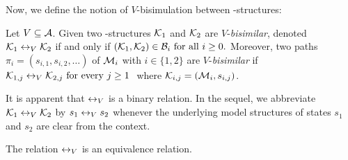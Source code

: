 \documentclass[letterpaper]{article} %
\begin{document}
Now, we define the notion of $V$-bisimulation between \MPK-structures:
\begin{definition}[$V$-bisimulation]
  \label{def:V-bisimulation}
   Let $V\subseteq\cal A$. Given   two \MPK-structures ${\cal K}_1$ and ${\cal K}_2$ are $V$-{\em bisimilar},  denoted ${\cal K}_1 \leftrightarrow_V {\cal K}_2$
 if and only if $ ({\cal K}_1,{\cal K}_2)\in {{\cal B}_i}\mbox{ for all }i\ge 0.$ Moreover, two paths $\pi_i=(s_{i,1},s_{i,2},\ldots)$ of ${\cal M}_i$ with $i\in \{1,2\}$
 are $V$-{\em bisimilar} if
$ {\cal K}_{1,j} \leftrightarrow_V {\cal K}_{2,j}\mbox { for every $j\ge 1$ }$
 where ${\cal K}_{i,j}=({\cal M}_i,s_{i,j})$.

\end{definition}



It is  apparent that $\leftrightarrow_V$ is a binary relation.
 In the sequel, we abbreviate ${\cal K}_1 \leftrightarrow_V {\cal K}_2$
 by $s_1 \leftrightarrow_V s_2 $
 whenever the underlying model structures of states $s_1$ and $s_2$ are clear from the context.%
\begin{lemma}\label{lem:equive}
  The relation $\leftrightarrow_V$ is an equivalence relation.
\end{lemma}
\end{document}
